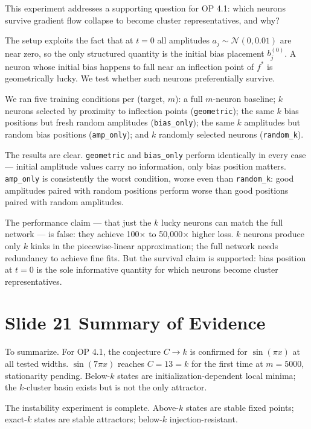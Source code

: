 \documentclass[11pt]{article}
\begin{document}
This experiment addresses a supporting question for OP 4.1: which neurons survive gradient flow collapse to become cluster representatives, and why?

The setup exploits the fact that at $t = 0$ all amplitudes $a_j \sim \mathcal{N}(0, 0.01)$ are near zero, so the only structured quantity is the initial bias placement $b_j^{(0)}$.
A neuron whose initial bias happens to fall near an inflection point of $f^*$ is geometrically lucky.
We test whether such neurons preferentially survive.

We ran five training conditions per (target, $m$): a full $m$-neuron baseline; $k$ neurons selected by proximity to inflection points (\texttt{geometric}); the same $k$ bias positions but fresh random amplitudes (\texttt{bias\_only}); the same $k$ amplitudes but random bias positions (\texttt{amp\_only}); and $k$ randomly selected neurons (\texttt{random\_k}).

The results are clear.
\texttt{geometric} and \texttt{bias\_only} perform identically in every case --- initial amplitude values carry no information, only bias position matters.
\texttt{amp\_only} is consistently the worst condition, worse even than \texttt{random\_k}: good amplitudes paired with random positions perform worse than good positions paired with random amplitudes.

The performance claim --- that just the $k$ lucky neurons can match the full network --- is false: they achieve 100$\times$ to 50{,}000$\times$ higher loss.
$k$ neurons produce only $k$ kinks in the piecewise-linear approximation; the full network needs redundancy to achieve fine fits.
But the survival claim is supported: bias position at $t = 0$ is the sole informative quantity for which neurons become cluster representatives.

\section*{Slide 21 \quad Summary of Evidence}

To summarize.
For OP 4.1, the conjecture $C \to k$ is confirmed for $\sin(\pi x)$ at all tested widths.
$\sin(7\pi x)$ reaches $C = 13 = k$ for the first time at $m = 5000$, stationarity pending.
Below-$k$ states are initialization-dependent local minima; the $k$-cluster basin exists but is not the only attractor.

The instability experiment is complete.
Above-$k$ states are stable fixed points; exact-$k$ states are stable attractors; below-$k$ injection-resistant.
\end{document}
